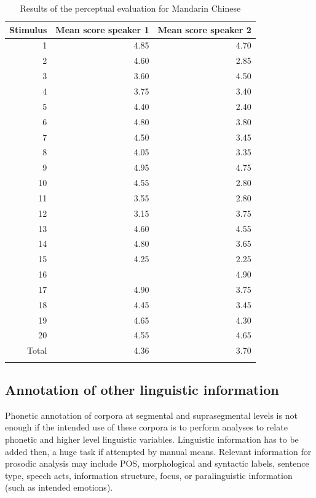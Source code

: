 \documentclass[output=paper]{langsci/langscibook}
\begin{document}
\begin{table}
\footnotesize
\begin{tabular}{rrr}
\lsptoprule
Stimulus & Mean score speaker 1 & Mean score speaker 2\\
\midrule
1 & 4.85 & 4.70\\
2 & 4.60 & 2.85\\
3 & 3.60 & 4.50\\
4 & 3.75 & 3.40\\
5 & 4.40 & 2.40\\
6 & 4.80 & 3.80\\
7 & 4.50 & 3.45\\
8 & 4.05 & 3.35\\
9 & 4.95 & 4.75\\
10 & 4.55 & 2.80\\
11 & 3.55 & 2.80\\
12 & 3.15 & 3.75\\
13 & 4.60 & 4.55\\
14 & 4.80 & 3.65\\
15 & 4.25 & 2.25\\
16 &  & 4.90\\
17 & 4.90 & 3.75\\
18 & 4.45 & 3.45\\
19 & 4.65 & 4.30\\
20 & 4.55 & 4.65\\
\midrule
Total & 4.36 & 3.70\\
\lspbottomrule
\end{tabular}
\caption{Results of the perceptual evaluation for Mandarin Chinese \citep{Yao2010}}
\label{tab:gar:4}
\end{table}

\subsection{Annotation of other linguistic information}

Phonetic annotation of corpora at segmental and suprasegmental levels is not enough if the intended use of these corpora is to perform analyses to relate phonetic and higher level linguistic variables. Linguistic information has to be added then, a huge task if attempted by manual means. Relevant information for prosodic analysis may include POS, morphological and syntactic labels, sentence type, speech acts, information structure, focus, or paralinguistic information (such as intended emotions).
\end{document}
